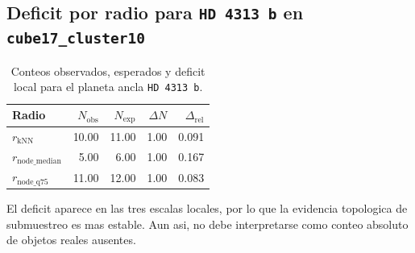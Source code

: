 \subsection{Deficit por radio para \texttt{HD 4313 b} en \texttt{cube17\_cluster10}}
\begin{table}[H]
\centering
\small
\caption{Conteos observados, esperados y deficit local para el planeta ancla \texttt{HD 4313 b}.}
\begin{tabular}{lrrrr}
\toprule
Radio & $N_{\mathrm{obs}}$ & $N_{\mathrm{exp}}$ & $\Delta N$ & $\Delta_{\mathrm{rel}}$ \\
\midrule
$r_{\mathrm{kNN}}$ & 10.00 & 11.00 & 1.00 & 0.091 \\
$r_{\mathrm{node\_median}}$ & 5.00 & 6.00 & 1.00 & 0.167 \\
$r_{\mathrm{node\_q75}}$ & 11.00 & 12.00 & 1.00 & 0.083 \\
\bottomrule
\end{tabular}
\end{table}
El deficit aparece en las tres escalas locales, por lo que la evidencia topologica de submuestreo es mas estable. Aun asi, no debe interpretarse como conteo absoluto de objetos reales ausentes.

